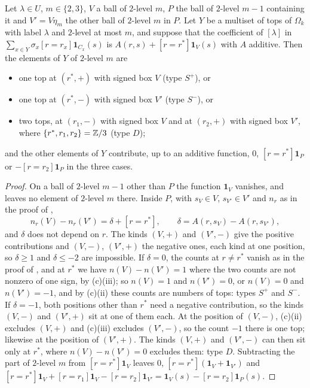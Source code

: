 \begin{lemma}\label{lem:labelthree}
Let $\lambda\in U$, $m\in\{2,3\}$, $V$ a ball of $2$-level $m$, $P$ the ball
of $2$-level $m-1$ containing it and $V'=V\eta_{m}$ the other ball of
$2$-level $m$ in $P$. Let $Y$ be a multiset of tops of $\Omega_{k}$ with label
$\lambda$ and $2$-level at most $m$, and suppose that the coefficient of
$[\lambda]$ in $\sum_{x\in Y}\sigma_{x}[r=r_{x}]\mathbf 1_{C_{x}}(s)$ is
$A(r,s)+[r=r^{*}]\mathbf 1_{V}(s)$ with $A$ additive. Then the elements of
$Y$ of $2$-level $m$ are
\begin{itemize}
\item one top at $(r^{*},+)$ with signed box $V$ \textup{(type $S^{+}$)}, or
\item one top at $(r^{*},-)$ with signed box $V'$ \textup{(type $S^{-}$)}, or
\item two tops, at $(r_{1},-)$ with signed box $V$ and at $(r_{2},+)$ with
signed box $V'$, where $\{r^{*},r_{1},r_{2}\}=\mathbb{Z}/3$ \textup{(type $D$)};
\end{itemize}
and the other elements of $Y$ contribute, up to an additive function, $0$,
$[r=r^{*}]\mathbf 1_{P}$ or $-[r=r_{2}]\mathbf 1_{P}$ in the three cases.
\end{lemma}

\begin{proof}
On a ball of $2$-level $m-1$ other than $P$ the function $\mathbf 1_{V}$
vanishes, and  leaves no element of $2$-level $m$ there.
Inside $P$, with $s_{V}\in V$, $s_{V'}\in V'$ and $n_{r}$ as in the proof
of ,
\[
  n_{r}(V)-n_{r}(V')=\delta+[r=r^{*}],\qquad\delta=A(r,s_{V})-A(r,s_{V'}),
\]
and $\delta$ does not depend on $r$. The kinds $(V,+)$ and $(V',-)$ give the
positive contributions and $(V,-)$, $(V',+)$ the negative ones, each kind at
one position, so $\delta\ge1$ and $\delta\le-2$ are impossible. If
$\delta=0$, the counts at $r\ne r^{*}$ vanish as in the proof of
, and at $r^{*}$ we have $n(V)-n(V')=1$ where the two
counts are not nonzero of one sign, by (c)(iii); so
$n(V)=1$ and $n(V')=0$, or $n(V)=0$ and $n(V')=-1$, and by
(c)(ii) these counts are numbers of tops: types $S^{+}$
and $S^{-}$. If $\delta=-1$, both positions other than $r^{*}$ need a negative
contribution, so the kinds $(V,-)$ and $(V',+)$ sit at one of them each. At
the position of $(V,-)$, (c)(ii) excludes $(V,+)$ and
(c)(iii) excludes $(V',-)$, so the count $-1$ there is one top; likewise at
the position of $(V',+)$. The kinds $(V,+)$ and $(V',-)$ can then sit only at
$r^{*}$, where $n(V)-n(V')=0$ excludes them: type $D$. Subtracting the part of
$2$-level $m$ from $[r=r^{*}]\mathbf 1_{V}$ leaves $0$, $[r=r^{*}](\mathbf
1_{V}+\mathbf 1_{V'})$ and $[r=r^{*}]\mathbf 1_{V}+[r=r_{1}]\mathbf 1_{V}-
[r=r_{2}]\mathbf 1_{V'}=\mathbf 1_{V}(s)-[r=r_{2}]\mathbf 1_{P}(s)$.
\end{proof}

